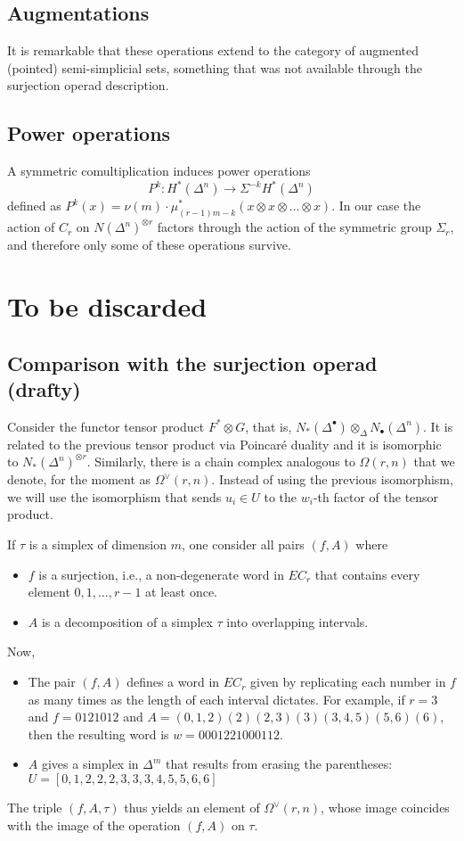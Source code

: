 \subsection{Augmentations} It is remarkable that these operations extend to the category of augmented (pointed) semi-simplicial sets, something that was not available through the surjection operad description.  

\subsection{Power operations} A symmetric comultiplication induces power operations 
\[P^k\colon H^*(\Delta^n)\to \Sigma^{-k} H^*(\Delta^n)\]
defined as $P^k(x) =\nu(m)\cdot \mu_{(r-1)m-k}^*(x\otimes x\otimes\ldots\otimes x)$. In our case the action of $C_r$ on $N(\Delta^n)^{\otimes r}$ factors through the action of the symmetric group $\Sigma_r$, and therefore only some of these operations survive. 

\section{To be discarded}
\subsection{Comparison with the surjection operad (drafty)}

Consider the functor tensor product $F^*\otimes G$, that is, $N_*(\Delta^\bullet)\otimes_\Delta N_\bullet(\Delta^n)$. It is related to the previous tensor product via Poincaré duality and it is isomorphic to $N_*(\Delta^n)^{\otimes r}$. Similarly, there is a chain complex analogous to $\Omega(r,n)$ that we denote, for the moment as $\Omega^\vee(r,n)$. Instead of using the previous isomorphism, we will use the isomorphism that sends $u_i\in U$ to the $w_i$-th factor of the tensor product.

If $\tau$ is a simplex of dimension $m$, one consider all pairs $(f,A)$ where
\begin{itemize}
	\item $f$ is a surjection, i.e., a non-degenerate word in $EC_r$ that contains every element $0,1,\ldots,r-1$ at least once.
	\item $A$ is a decomposition of a simplex $\tau$ into overlapping intervals.
\end{itemize}
Now,
\begin{itemize}
	\item The pair $(f,A)$ defines a word in $EC_r$ given by replicating each number in $f$ as many times as the length of each interval dictates. For example, if $r=3$ and $f= 0121012$ and $A=(0,1,2)(2)(2,3)(3)(3,4,5)(5,6)(6)$, then the resulting word is $w=0001221000112$.
	\item $A$ gives a simplex in $\Delta^m$ that results from erasing the parentheses: $U=[0,1,2,2,2,3,3,3,4,5,5,6,6]$
\end{itemize}
The triple $(f,A,\tau)$ thus yields an element of $\Omega^\vee(r,n)$, whose image coincides with the image of the operation $(f,A)$ on $\tau$.


